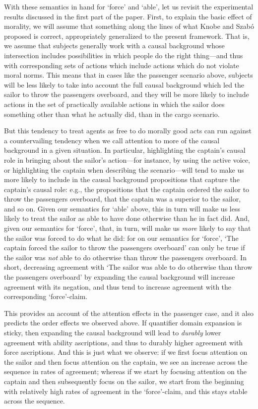 \documentclass{salt}
\begin{document}
With these semantics in hand for `force' and `able', let us revisit the experimental results discussed in the first part of the paper. First, to explain the basic effect of morality, we will assume that something along the lines of what Knobe and Szab\'{o} proposed is correct, appropriately generalized to the present framework. That is, we assume that subjects generally work with a causal background whose intersection includes possibilities in which people do the right thing---and thus with corresponding sets of actions which include actions which do not violate moral norms.  This means that in cases like the passenger scenario above, subjects will be less likely to take into account the full causal background which led the sailor to throw the passengers overboard, and they will be more likely to include actions in the set of practically available actions in which the sailor does something other than what he actually did, than in the cargo scenario.

But this tendency to treat agents as free to do morally good acts can run against a countervailing tendency when we call attention to more of the causal background in a given situation. In particular, highlighting the captain's causal role in bringing about the sailor's action---for instance, by using  the active voice, or highlighting the captain when describing the scenario---will tend to make us more likely to include in the causal background propositions that capture the captain's causal role: e.g., the propositions that the captain ordered the sailor to throw the passengers overboard, that the captain was a superior to the sailor, and so on. Given our semantics for `able' above, this in turn will make us less likely to treat the sailor as able to have done otherwise than he in fact did. And, given our semantics for `force', that, in turn, will make us \emph{more} likely to say that the sailor was forced to do what he did: for on our semantics for `force', `The captain forced the sailor to throw the passengers overboard' can only be true if the sailor was \emph{not} able to do otherwise than throw the passengers overboard. In short, decreasing agreement with `The sailor was able to do otherwise than throw the passengers overboard' by expanding the causal background will increase agreement with its negation, and thus tend to increase agreement with the corresponding `force'-claim.

This provides an account of the attention effects in the passenger case, and it also predicts the order effects we observed above. If quantifier domain expansion is sticky, then expanding the causal background will lead to \emph{durably} lower agreement with ability ascriptions, and thus to durably higher agreement with force ascriptions. And this is just what we observe: if we first focus attention on the sailor and then focus attention on the captain, we see an increase across the sequence in rates of agreement; whereas if we start by focusing attention on the captain and then subsequently focus on the sailor, we start from the beginning with relatively high rates of agreement in the `force'-claim, and this stays stable across the sequence.
\end{document}
